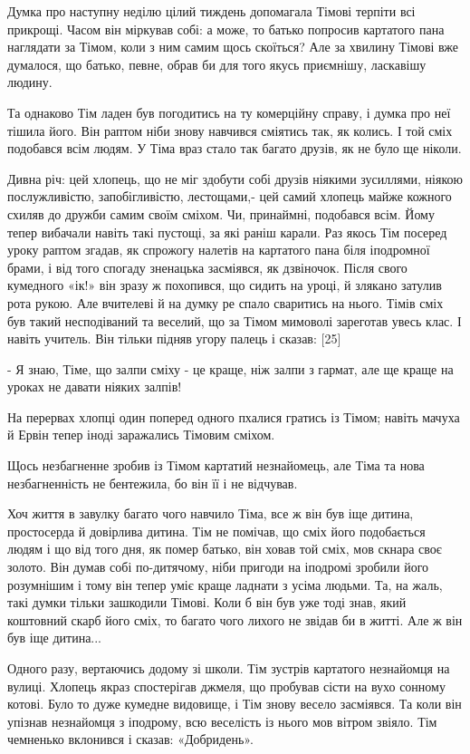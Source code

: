 Думка про наступну неділю цілий тиждень допомагала Тімові терпіти всі прикрощі. Часом він міркував собі: а може, то батько попросив картатого пана наглядати за Тімом, коли з ним самим щось скоїться? Але за хвилину Тімові вже думалося, що батько, певне, обрав би для того якусь приємнішу, ласкавішу людину.

Та однаково Тім ладен був погодитись на ту комерційну справу, і думка про неї тішила його. Він раптом ніби знову навчився сміятись так, як колись. І той сміх подобався всім людям. У Тіма враз стало так багато друзів, як не було ще ніколи.

Дивна річ: цей хлопець, що не міг здобути собі друзів ніякими зусиллями, ніякою послужливістю, запобігливістю, лестощами,- цей самий хлопець майже кожного схиляв до дружби самим своїм сміхом. Чи, принаймні, подобався всім. Йому тепер вибачали навіть такі пустощі, за які раніш карали. Раз якось Тім посеред уроку раптом згадав, як спрожогу налетів на картатого пана біля іподромної брами, і від того спогаду зненацька засміявся, як дзвіночок. Після свого кумедного «ік!» він зразу ж похопився, що сидить на уроці, й злякано затулив рота рукою. Але вчителеві й на думку ре спало сваритись на нього. Тімів сміх був такий несподіваний та веселий, що за Тімом мимоволі зареготав увесь клас. І навіть учитель. Він тільки підняв угору палець і сказав: [25]

- Я знаю, Тіме, що залпи сміху - це краще, ніж залпи з гармат, але ще краще на уроках не давати ніяких залпів!

На перервах хлопці один поперед одного пхалися гратись із Тімом; навіть мачуха й Ервін тепер іноді заражались Тімовим сміхом.

Щось незбагненне зробив із Тімом картатий незнайомець, але Тіма та нова незбагненність не бентежила, бо він її і не відчував.

Хоч життя в завулку багато чого навчило Тіма, все ж він був іще дитина, простосерда й довірлива дитина. Тім не помічав, що сміх його подобається людям і що від того дня, як помер батько, він ховав той сміх, мов скнара своє золото. Він думав собі по-дитячому, ніби пригоди на іподромі зробили його розумнішим і тому він тепер уміє краще ладнати з усіма людьми. Та, на жаль, такі думки тільки зашкодили Тімові. Коли б він був уже тоді знав, який коштовний скарб його сміх, то багато чого лихого не звідав би в житті. Але ж він був іще дитина...

Одного разу, вертаючись додому зі школи. Тім зустрів картатого незнайомця на вулиці. Хлопець якраз спостерігав джмеля, що пробував сісти на вухо сонному котові. Було то дуже кумедне видовище, і Тім знову весело засміявся. Та коли він упізнав незнайомця з іподрому, всю веселість із нього мов вітром звіяло. Тім чемненько вклонився і сказав: «Добридень».

